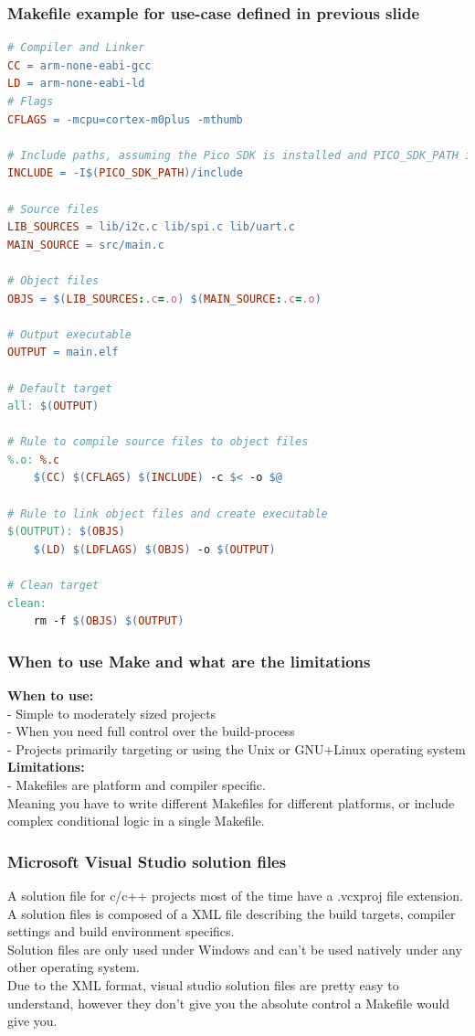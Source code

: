 \documentclass{beamer}
\begin{document}
\begin{frame}[fragile]
\frametitle{Makefile example for use-case defined in previous slide}
\tiny
\begin{lstlisting}[language=make]
# Compiler and Linker
CC = arm-none-eabi-gcc
LD = arm-none-eabi-ld
# Flags
CFLAGS = -mcpu=cortex-m0plus -mthumb

# Include paths, assuming the Pico SDK is installed and PICO_SDK_PATH is set
INCLUDE = -I$(PICO_SDK_PATH)/include

# Source files
LIB_SOURCES = lib/i2c.c lib/spi.c lib/uart.c
MAIN_SOURCE = src/main.c

# Object files
OBJS = $(LIB_SOURCES:.c=.o) $(MAIN_SOURCE:.c=.o)

# Output executable
OUTPUT = main.elf

# Default target
all: $(OUTPUT)

# Rule to compile source files to object files
%.o: %.c
	$(CC) $(CFLAGS) $(INCLUDE) -c $< -o $@

# Rule to link object files and create executable
$(OUTPUT): $(OBJS)
	$(LD) $(LDFLAGS) $(OBJS) -o $(OUTPUT)

# Clean target
clean:
	rm -f $(OBJS) $(OUTPUT)
\end{lstlisting}
\end{frame}

\begin{frame}
\frametitle{When to use Make and what are the limitations}
\textbf{When to use:} \\
- Simple to moderately sized projects \\
- When you need full control over the build-process \\
- Projects primarily targeting or using the Unix or GNU+Linux operating system \\
\textbf{Limitations:} \\
- Makefiles are platform and compiler specific. \\
Meaning you have to write different Makefiles for different platforms, or include complex conditional logic in a single Makefile.
\end{frame}

\begin{frame}
\frametitle{Microsoft Visual Studio solution files}
A solution file for c/c++ projects most of the time have a .vcxproj file extension.\\
A solution files is composed of a XML file describing the build targets, compiler settings and build environment specifics. \\ \bigskip
Solution files are only used under Windows and can't be used natively under any other operating system. \\ \bigskip
Due to the XML format, visual studio solution files are pretty easy to understand, however they don't give you the absolute control a Makefile would give you.
\end{frame}
\end{document}
